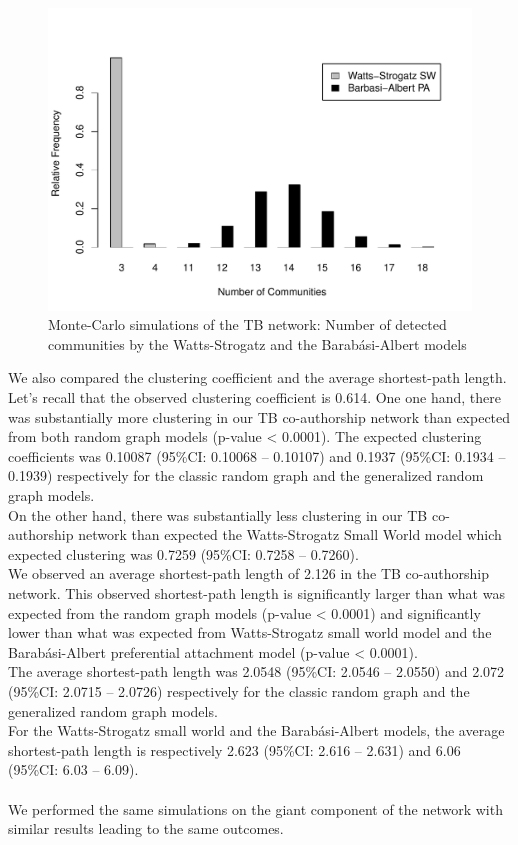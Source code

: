 \begin{figure}[h!]
\centering
\includegraphics[scale=0.65]{Chapters/tb/mechanisticComm}
\caption{Monte-Carlo simulations of the TB network: Number of detected communities by the Watts-Strogatz and the Barab\'asi-Albert models}
\label{tb_fig4}
\end{figure}

We also compared the clustering coefficient and the average shortest-path length. Let's recall that the observed clustering coefficient is 0.614. One one hand, there was substantially more clustering in our TB co-authorship network than expected from both random graph models (p-value < 0.0001). The expected clustering coefficients was 0.10087 (95\%CI: 0.10068 -- 0.10107) and 0.1937 (95\%CI: 0.1934 -- 0.1939) respectively for the classic random graph and the generalized random graph models.\\
On the other hand, there was substantially less clustering in our TB co-authorship network than expected the Watts-Strogatz Small World model which expected clustering was 0.7259 (95\%CI: 0.7258 -- 0.7260).\\
We observed an average shortest-path length of 2.126 in the TB co-authorship network. This observed shortest-path length is significantly larger than what was expected from the random graph models (p-value < 0.0001) and significantly lower than what was expected from Watts-Strogatz small world model and the Barab\'asi-Albert preferential attachment model (p-value < 0.0001).\\The average shortest-path length was 2.0548 (95\%CI: 2.0546 -- 2.0550) and 2.072 (95\%CI: 2.0715 -- 2.0726) respectively for the classic random graph and the generalized random graph models.\\For the Watts-Strogatz small world and the Barab\'asi-Albert models, the average shortest-path length is respectively 2.623 (95\%CI: 2.616 -- 2.631) and 6.06 (95\%CI: 6.03 -- 6.09).\\~\\
We performed the same simulations on the giant component of the network with similar results leading to the same outcomes.

